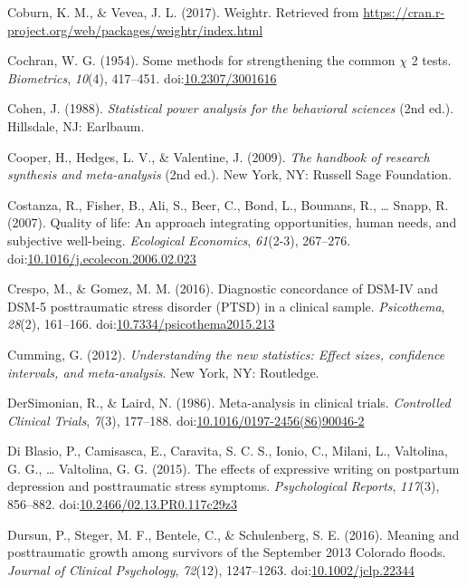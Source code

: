 \documentclass[man, mask]{apa6}
\theoremstyle{definition}
\theoremstyle{definition}
\theoremstyle{definition}
\theoremstyle{remark}
\begin{document}
\hypertarget{ref-Coburn2017}{}
Coburn, K. M., \& Vevea, J. L. (2017). Weightr. Retrieved from
\url{https://cran.r-project.org/web/packages/weightr/index.html}

\hypertarget{ref-Cochran1954}{}
Cochran, W. G. (1954). Some methods for strengthening the common
\(\chi\) 2 tests. \emph{Biometrics}, \emph{10}(4), 417--451.
doi:\href{https://doi.org/10.2307/3001616}{10.2307/3001616}

\hypertarget{ref-Cohen1988}{}
Cohen, J. (1988). \emph{Statistical power analysis for the behavioral
sciences} (2nd ed.). Hillsdale, NJ: Earlbaum.

\hypertarget{ref-Cooper2009}{}
Cooper, H., Hedges, L. V., \& Valentine, J. (2009). \emph{The handbook
of research synthesis and meta-analysis} (2nd ed.). New York, NY:
Russell Sage Foundation.

\hypertarget{ref-Costanza2007}{}
Costanza, R., Fisher, B., Ali, S., Beer, C., Bond, L., Boumans, R.,
\ldots{} Snapp, R. (2007). Quality of life: An approach integrating
opportunities, human needs, and subjective well-being. \emph{Ecological
Economics}, \emph{61}(2-3), 267--276.
doi:\href{https://doi.org/10.1016/j.ecolecon.2006.02.023}{10.1016/j.ecolecon.2006.02.023}

\hypertarget{ref-Crespo2016}{}
Crespo, M., \& Gomez, M. M. (2016). Diagnostic concordance of DSM-IV and
DSM-5 posttraumatic stress disorder (PTSD) in a clinical sample.
\emph{Psicothema}, \emph{28}(2), 161--166.
doi:\href{https://doi.org/10.7334/psicothema2015.213}{10.7334/psicothema2015.213}

\hypertarget{ref-Cumming2012}{}
Cumming, G. (2012). \emph{Understanding the new statistics: Effect
sizes, confidence intervals, and meta-analysis}. New York, NY:
Routledge.

\hypertarget{ref-DerSimonian1986}{}
DerSimonian, R., \& Laird, N. (1986). Meta-analysis in clinical trials.
\emph{Controlled Clinical Trials}, \emph{7}(3), 177--188.
doi:\href{https://doi.org/10.1016/0197-2456(86)90046-2}{10.1016/0197-2456(86)90046-2}

\hypertarget{ref-Blasio2015a}{}
Di Blasio, P., Camisasca, E., Caravita, S. C. S., Ionio, C., Milani, L.,
Valtolina, G. G., \ldots{} Valtolina, G. G. (2015). The effects of
expressive writing on postpartum depression and posttraumatic stress
symptoms. \emph{Psychological Reports}, \emph{117}(3), 856--882.
doi:\href{https://doi.org/10.2466/02.13.PR0.117c29z3}{10.2466/02.13.PR0.117c29z3}

\hypertarget{ref-Dursun2016}{}
Dursun, P., Steger, M. F., Bentele, C., \& Schulenberg, S. E. (2016).
Meaning and posttraumatic growth among survivors of the September 2013
Colorado floods. \emph{Journal of Clinical Psychology}, \emph{72}(12),
1247--1263.
doi:\href{https://doi.org/10.1002/jclp.22344}{10.1002/jclp.22344}
\end{document}
